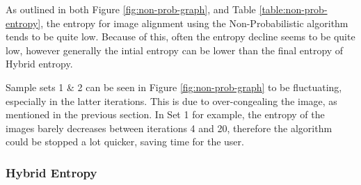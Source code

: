 As outlined in both Figure \ref{fig:non-prob-graph}, and Table \ref{table:non-prob-entropy}, the entropy for image alignment using the Non-Probabilistic algorithm tends to be quite low. Because of this, often the entropy decline seems to be quite low, however generally the intial entropy can be lower than the final entropy of Hybrid entropy.

Sample sets 1 \& 2 can be seen in Figure \ref{fig:non-prob-graph} to be fluctuating, especially in the latter iterations. This is due to over-congealing the image, as mentioned in the previous section. In Set 1 for example, the entropy of the images barely decreases between iterations 4 and 20, therefore the algorithm could be stopped a lot quicker, saving time for the user.

\newpage
\subsubsection{Hybrid Entropy}
\label{sssec:hybrid-alignment}

